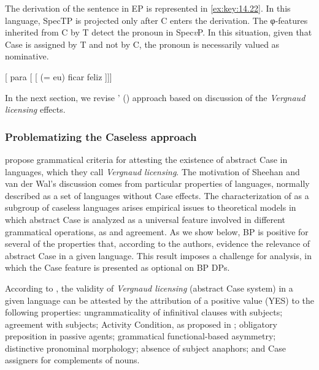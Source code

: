 \documentclass[output=paper]{langsci/langscibook}
\begin{document}
The derivation of the sentence in \gls{EP} is represented in \eqref{ex:key:14.22}.
In this language, SpecTP is projected only after C enters the derivation. The
φ-features inherited from C by T detect the pronoun in Spec\emph{v}P. In this
situation, given that Case is assigned by T and not by C, the pronoun is
necessarily valued as nominative.

\ea\label{ex:key:14.22}
    {}[ para [ [ \Fsg{} (= eu) ficar  feliz ]]]
\z

In the next section, we revise \citeauthor{AvelarGalves2011}'
(\citeyear{AvelarGalves2011,AvelarGalves2016}) approach based on
 discussion of the \emph{Vergnaud licensing}
effects.

\subsubsection{Problematizing the Caseless approach}\label{sec:key:14.4.2.2}

\textcite{SheevanderWal2018} propose grammatical criteria for attesting the
existence of abstract Case in languages, which they call \emph{Vergnaud
licensing}. The motivation of Sheehan and van der Wal’s discussion comes from
particular properties of  languages, normally described as a set of
languages without Case effects. The characterization of  as a subgroup of
caseless languages arises empirical issues to theoretical models in which
abstract Case is analyzed as a universal feature involved in different
grammatical operations, as  and agreement. As we show below, \gls{BP}
is positive for several of the properties that, according to the authors,
evidence the relevance of abstract Case in a given language. This result
imposes a challenge for  analysis,
in which the Case feature is presented as optional on \gls{BP} DPs.

According to \textcite{SheevanderWal2018}, the validity of \emph{Vergnaud
licensing} (abstract Case system) in a given language can be attested by the
attribution of a positive value (YES) to the following properties:
ungrammaticality of infinitival clauses with subjects; agreement with subjects;
Activity Condition, as proposed in \textcite{Chomsky2000,Chomsky2001};
obligatory preposition in passive agents; grammatical functional-based
asymmetry; distinctive pronominal morphology; absence of subject anaphors; and
Case assigners for complements of nouns.
\end{document}
